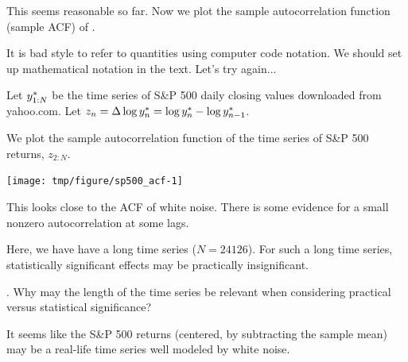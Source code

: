 \begin{frame}[fragile]


\bi
\item This seems reasonable so far. Now we plot the sample autocorrelation function (sample ACF) of . 

\item It is bad style to refer to quantities using computer code notation. We should set up mathematical notation in the text. Let's try again...

\item Let $y_{1:N}^*$ be the time series of S\&P 500 daily closing values downloaded from yahoo.com.  Let $z_n= \Delta \log y_n^* = \log y_{n}^*-\log y_{n-1}^*$. 

\item We plot the sample autocorrelation function of the time series of S\&P 500 returns, ${z_{2:N}}$.
\begin{knitrout}\small
{}\color{fgcolor}\begin{kframe}
\begin{alltt}
 \hlkwb{<-} \hlstd{(}
\end{alltt}
\end{kframe}
\end{knitrout}
\ei
\vspace{-1mm}

\begin{knitrout}\small
{}\color{fgcolor}

{\centering \texttt{[image: tmp/figure/sp500\_acf-1]} 

}


\end{knitrout}

\end{frame}

\begin{frame}[fragile]
\bi
\item This looks close to the ACF of white noise. There is some evidence for a small nonzero autocorrelation at some lags. 

\item Here, we have have a long time series ($N=24126$). For such a long time series, statistically significant effects may be practically insignificant. 
 
\ei

\myquestion. Why may the length of the time series be relevant when considering practical versus statistical significance? 


\bi
\item It seems like the S\&P 500 returns (centered, by subtracting the sample mean) may be a real-life time series well modeled by white noise.
\ei

\end{frame} 


